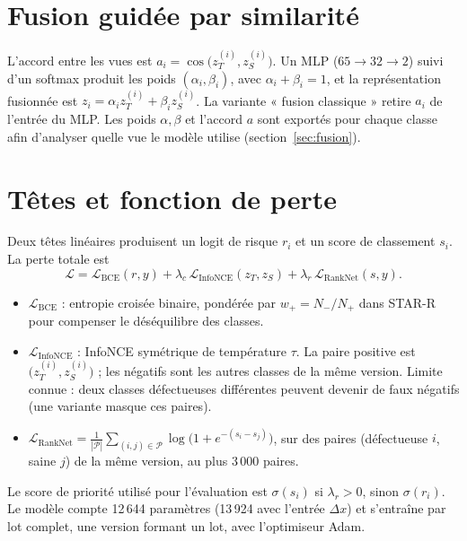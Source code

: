 \documentclass[11pt,a4paper,openany]{report}
\begin{document}
\section{Fusion guidée par similarité}
L'accord entre les vues est $a_i=\cos\big(z_T^{(i)},z_S^{(i)}\big)$. Un MLP ($65\to32\to2$) suivi d'un softmax
produit les poids $(\alpha_i,\beta_i)$, avec $\alpha_i+\beta_i=1$, et la représentation fusionnée est
$z_i=\alpha_i z_T^{(i)}+\beta_i z_S^{(i)}$. La variante « fusion classique » retire $a_i$ de l'entrée du MLP.
Les poids $\alpha,\beta$ et l'accord $a$ sont exportés pour chaque classe afin d'analyser quelle vue le modèle utilise
(section~\ref{sec:fusion}).

\section{Têtes et fonction de perte}
Deux têtes linéaires produisent un logit de risque $r_i$ et un score de classement $s_i$. La perte totale est
\[
\mathcal{L}=\mathcal{L}_{\mathrm{BCE}}(r,y)+\lambda_c\,\mathcal{L}_{\mathrm{InfoNCE}}(z_T,z_S)+\lambda_r\,\mathcal{L}_{\mathrm{RankNet}}(s,y).
\]
\begin{itemize}
  \item $\mathcal{L}_{\mathrm{BCE}}$ : entropie croisée binaire, pondérée par $w_+=N_-/N_+$ dans STAR-R pour compenser
        le déséquilibre des classes.
  \item $\mathcal{L}_{\mathrm{InfoNCE}}$ : InfoNCE symétrique de température $\tau$. La paire positive est
        $\big(z_T^{(i)},z_S^{(i)}\big)$ ; les négatifs sont les autres classes de la même version. Limite connue : deux
        classes défectueuses différentes peuvent devenir de faux négatifs (une variante masque ces paires).
  \item $\mathcal{L}_{\mathrm{RankNet}}=\frac{1}{|\mathcal{P}|}\sum_{(i,j)\in\mathcal{P}}\log\!\big(1+e^{-(s_i-s_j)}\big)$,
        sur des paires (défectueuse $i$, saine $j$) de la même version, au plus 3\,000 paires.
\end{itemize}
Le score de priorité utilisé pour l'évaluation est $\sigma(s_i)$ si $\lambda_r>0$, sinon $\sigma(r_i)$.
Le modèle compte 12\,644 paramètres (13\,924 avec l'entrée $\Delta x$) et s'entraîne par lot complet, une version
formant un lot, avec l'optimiseur Adam.
\end{document}

